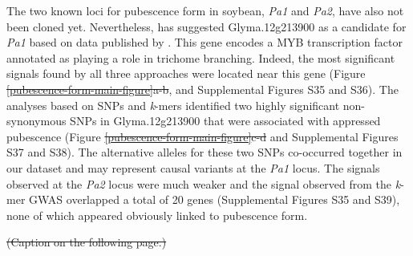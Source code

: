 \documentclass{article}
\providecommand{\DIFaddtex}[1]{{\protect\color{blue}\uwave{#1}}} %
\providecommand{\DIFdeltex}[1]{{\protect\color{red}\sout{#1}}}                      %
\providecommand{\DIFaddbegin}{} %
\providecommand{\DIFaddend}{} %
\providecommand{\DIFdelbegin}{} %
\providecommand{\DIFdelend}{} %
\providecommand{\DIFdelFL}[1]{\DIFdel{#1}} %
\providecommand{\DIFadd}[1]{\texorpdfstring{\DIFaddtex{#1}}{#1}} %
\providecommand{\DIFdel}[1]{\texorpdfstring{\DIFdeltex{#1}}{}} %
\newcommand{\DIFscaledelfig}{0.5}
\newlength{\DIFdelgraphicswidth} %
\newlength{\DIFdelgraphicsheight} %
\newcommand{\DIFaddincludegraphics}[2][]{{\color{blue}\fbox{\DIFOincludegraphics[#1]{#2}}}} %
\newcommand{\DIFdelincludegraphics}[2][]{%
\sbox{\DIFdelgraphicsbox}{\DIFOincludegraphics[#1]{#2}}%
\settoboxwidth{\DIFdelgraphicswidth}{\DIFdelgraphicsbox} %
\settoboxtotalheight{\DIFdelgraphicsheight}{\DIFdelgraphicsbox} %
\scalebox{\DIFscaledelfig}{%
\parbox[b]{\DIFdelgraphicswidth}{\usebox{\DIFdelgraphicsbox}\\[-\baselineskip] \rule{\DIFdelgraphicswidth}{0em}}\llap{\resizebox{\DIFdelgraphicswidth}{\DIFdelgraphicsheight}{%
\setlength{\unitlength}{\DIFdelgraphicswidth}%
\begin{picture}(1,1)%
\thicklines\linethickness{2pt} %
{\color[rgb]{1,0,0}\put(0,0){\framebox(1,1){}}}%
{\color[rgb]{1,0,0}\put(0,0){\line( 1,1){1}}}%
{\color[rgb]{1,0,0}\put(0,1){\line(1,-1){1}}}%
\end{picture}%
}\hspace*{3pt}}} %
} %
\DeclareRobustCommand{\DIFaddbegin}{\DIFOaddbegin \let\includegraphics\DIFaddincludegraphics} %
\DeclareRobustCommand{\DIFaddend}{\DIFOaddend \let\includegraphics\DIFOincludegraphics} %
\DeclareRobustCommand{\DIFdelbegin}{\DIFOdelbegin \let\includegraphics\DIFdelincludegraphics} %
\DeclareRobustCommand{\DIFdelend}{\DIFOaddend \let\includegraphics\DIFOincludegraphics} %
\begin{document}
The two known loci for pubescence form in soybean, \textit{Pa1} and
\textit{Pa2}, have also not been cloned yet. Nevertheless, 
has suggested Glyma.12g213900 as a candidate for \textit{Pa1} based on data
published by . This gene encodes a MYB transcription factor
annotated as playing a role in trichome branching. Indeed, the most significant
signals found by all three approaches were located near this gene (Figure
\DIFdelbegin \DIFdel{\ref{pubescence-form-main-figure}a-b}\DIFdelend \DIFaddbegin \DIFadd{5a-b}\DIFaddend , and Supplemental Figures S35 and
S36).  The analyses based on SNPs and
\emph{k}-mers identified two highly significant non-synonymous SNPs in
Glyma.12g213900 that were associated with appressed pubescence (Figure
\DIFdelbegin \DIFdel{\ref{pubescence-form-main-figure}c-d }\DIFdelend \DIFaddbegin \DIFadd{5c-d }\DIFaddend and Supplemental Figures S37 and
S38). The alternative alleles for these two
SNPs co-occurred together in our dataset and may represent causal variants at
the \emph{Pa1} locus. The signals observed at the \emph{Pa2} locus were much
weaker and the signal observed from the \emph{k}-mer GWAS overlapped a total of
20 genes (Supplemental Figures S35 and
S39), none of which appeared obviously linked
to pubescence form.


\DIFdelbegin %
{%
\DIFdelFL{(Caption on the following page.)}}
\end{document}
